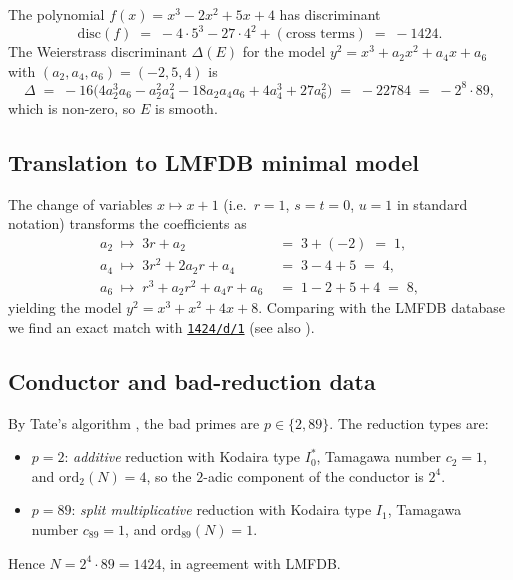 \documentclass[11pt,a4paper]{article}
\theoremstyle{plain}
\theoremstyle{definition}
\newcommand{\LMFDB}[1]{\href{https://www.lmfdb.org/EllipticCurve/Q/#1}{\texttt{#1}}}
\begin{document}
The polynomial $f(x) = x^3 - 2x^2 + 5x + 4$ has discriminant
\begin{equation*}
  \mathrm{disc}(f) \;=\; -4 \cdot 5^3 - 27 \cdot 4^2 + (\text{cross terms}) \;=\; -1424.
\end{equation*}
The Weierstrass discriminant $\Delta(E)$ for the model
$y^2 = x^3 + a_2 x^2 + a_4 x + a_6$ with $(a_2,a_4,a_6) = (-2,5,4)$ is
\begin{equation*}
  \Delta \;=\; -16\bigl( 4 a_2^3 a_6 - a_2^2 a_4^2 - 18 a_2 a_4 a_6 + 4 a_4^3 + 27 a_6^2 \bigr)
  \;=\; -22784 \;=\; -2^8 \cdot 89,
\end{equation*}
which is non-zero, so $E$ is smooth.

\subsection{Translation to LMFDB minimal model}

The change of variables $x \mapsto x+1$ (i.e.\ $r=1$, $s=t=0$, $u=1$
in standard notation) transforms the coefficients as
\begin{align*}
  a_2 \;\mapsto\; 3r + a_2 &\;=\; 3 + (-2) \;=\; 1,\\
  a_4 \;\mapsto\; 3r^2 + 2 a_2 r + a_4 &\;=\; 3 - 4 + 5 \;=\; 4,\\
  a_6 \;\mapsto\; r^3 + a_2 r^2 + a_4 r + a_6 &\;=\; 1 - 2 + 5 + 4 \;=\; 8,
\end{align*}
yielding the model $y^2 = x^3 + x^2 + 4 x + 8$. Comparing with the
LMFDB database \cite{LMFDB} we find an exact match with
\LMFDB{1424/d/1} (see also \cite{Cremona1997}).

\subsection{Conductor and bad-reduction data}

By Tate's algorithm \cite[IV.\S 9]{SilvermanII1994}, the bad primes
are $p \in \{2, 89\}$. The reduction types are:
\begin{itemize}
\item $p = 2$: \emph{additive} reduction with Kodaira type $I_0^{*}$,
  Tamagawa number $c_2 = 1$, and $\mathrm{ord}_2(N) = 4$, so the
  $2$-adic component of the conductor is $2^4$.
\item $p = 89$: \emph{split multiplicative} reduction with Kodaira
  type $I_1$, Tamagawa number $c_{89} = 1$, and $\mathrm{ord}_{89}(N) = 1$.
\end{itemize}
Hence $N = 2^4 \cdot 89 = 1424$, in agreement with LMFDB.
\end{document}
